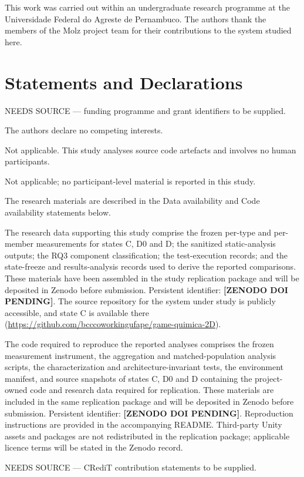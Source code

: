 \documentclass[pdflatex,sn-basic]{sn-jnl}
\begin{document}
\FloatBarrier

\backmatter


This work was carried out within an undergraduate research programme at the Universidade Federal do Agreste de Pernambuco. The authors thank the members of the Molz project team for their contributions to the system studied here.

\section*{Statements and Declarations}

NEEDS SOURCE --- funding programme and grant identifiers to be supplied.

The authors declare no competing interests.

Not applicable. This study analyses source code artefacts and involves no human participants.

Not applicable; no participant-level material is reported in this study.

The research materials are described in the Data availability and Code availability statements below.

The research data supporting this study comprise the frozen per-type and per-member measurements for states C, D0 and D; the sanitized static-analysis outputs; the RQ3 component classification; the test-execution records; and the state-freeze and results-analysis records used to derive the reported comparisons. These materials have been assembled in the study replication package and will be deposited in Zenodo before submission. Persistent identifier: \textbf{[ZENODO DOI PENDING]}. The source repository for the system under study is publicly accessible, and state C is available there (\url{https://github.com/bcccoworkingufape/game-quimica-2D}).

The code required to reproduce the reported analyses comprises the frozen measurement instrument, the aggregation and matched-population analysis scripts, the characterization and architecture-invariant tests, the environment manifest, and source snapshots of states C, D0 and D containing the project-owned code and research data required for replication. These materials are included in the same replication package and will be deposited in Zenodo before submission. Persistent identifier: \textbf{[ZENODO DOI PENDING]}. Reproduction instructions are provided in the accompanying README. Third-party Unity assets and packages are not redistributed in the replication package; applicable licence terms will be stated in the Zenodo record.

NEEDS SOURCE --- CRediT contribution statements to be supplied.


\end{document}
